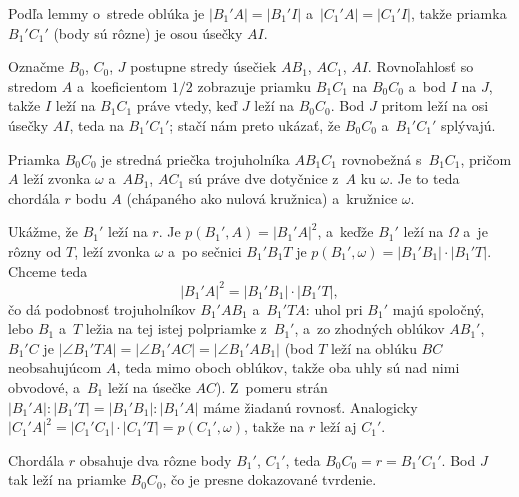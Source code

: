 {    Podľa lemmy o~strede oblúka je $|B_1'A| = |B_1'I|$ a~$|C_1'A| = |C_1'I|$, takže priamka $B_1'C_1'$ (body sú rôzne) je osou úsečky $AI$.

    Označme $B_0$, $C_0$, $J$ postupne stredy úsečiek $AB_1$, $AC_1$, $AI$. Rovnoľahlosť so stredom $A$ a~koeficientom $1/2$ zobrazuje priamku $B_1C_1$ na $B_0C_0$ a~bod $I$ na $J$, takže $I$ leží na $B_1C_1$ práve vtedy, keď $J$ leží na $B_0C_0$. Bod $J$ pritom leží na osi úsečky $AI$, teda na $B_1'C_1'$; stačí nám preto ukázať, že $B_0C_0$ a~$B_1'C_1'$ splývajú.

    Priamka $B_0C_0$ je stredná priečka trojuholníka $AB_1C_1$ rovnobežná s~$B_1C_1$, pričom $A$ leží zvonka $\omega$ a~$AB_1$, $AC_1$ sú práve dve dotyčnice z~$A$ ku $\omega$. Je to teda chordála $r$ bodu $A$ (chápaného ako nulová kružnica) a~kružnice $\omega$.

    Ukážme, že $B_1'$ leží na $r$. Je $p(B_1',A) = |B_1'A|^2$, a~keďže $B_1'$ leží na $\Omega$ a~je rôzny od $T$, leží zvonka $\omega$ a~po sečnici $B_1'B_1T$ je $p(B_1',\omega) = |B_1'B_1| \cdot |B_1'T|$. Chceme teda
    $$
    |B_1'A|^2 = |B_1'B_1| \cdot |B_1'T| ,
    $$
    čo dá podobnosť trojuholníkov $B_1'AB_1$ a~$B_1'TA$: uhol pri $B_1'$ majú spoločný, lebo $B_1$ a~$T$ ležia na tej istej polpriamke z~$B_1'$, a~zo zhodných oblúkov $AB_1'$, $B_1'C$ je $|\angle B_1'TA| = |\angle B_1'AC| = |\angle B_1'AB_1|$ (bod $T$ leží na oblúku $BC$ neobsahujúcom $A$, teda mimo oboch oblúkov, takže oba uhly sú nad nimi obvodové, a~$B_1$ leží na úsečke $AC$). Z~pomeru strán $|B_1'A| : |B_1'T| = |B_1'B_1| : |B_1'A|$ máme žiadanú rovnosť. Analogicky $|C_1'A|^2 = |C_1'C_1| \cdot |C_1'T| = p(C_1',\omega)$, takže na $r$ leží aj $C_1'$.

    Chordála $r$ obsahuje dva rôzne body $B_1'$, $C_1'$, teda $B_0C_0 = r = B_1'C_1'$. Bod $J$ tak leží na priamke $B_0C_0$, čo je presne dokazované tvrdenie.
}

